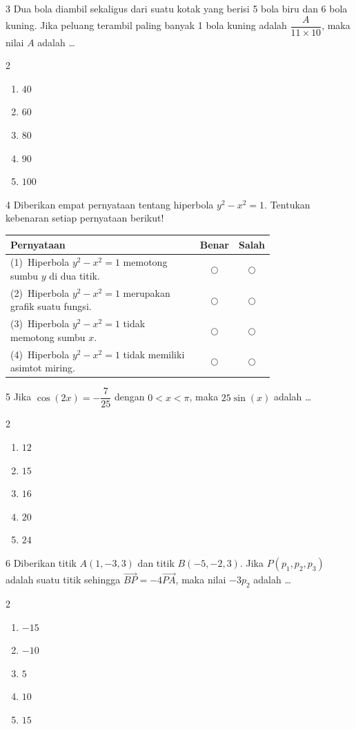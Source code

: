\documentclass[11pt]{article}
\newenvironment{pilB}{%
  \par\smallskip\begin{multicols}{2}
  \begin{enumerate}[label=(\Alph*),leftmargin=*,itemsep=1pt,topsep=3pt]}%
  {\end{enumerate}\end{multicols}}
\begin{document}
\begin{soal}{3}
Dua bola diambil sekaligus dari suatu kotak yang berisi 5 bola biru
dan 6 bola kuning. Jika peluang terambil paling banyak 1 bola kuning
adalah $\dfrac{A}{11\times10}$, maka nilai $A$ adalah \ldots
\begin{pilB}
  \item $40$ \item $60$ \item $80$ \item $90$ \item $100$
\end{pilB}
\end{soal}

\begin{soal}{4}
Diberikan empat pernyataan tentang hiperbola $y^2-x^2=1$.
Tentukan kebenaran setiap pernyataan berikut!

\par\smallskip
{\renewcommand{\arraystretch}{1.4}%
\begin{tabular}{@{}p{0.76\linewidth}cc@{}}
\hline
\textbf{Pernyataan} & \textbf{Benar} & \textbf{Salah}\\
\hline
(1)~Hiperbola $y^2-x^2=1$ memotong sumbu $y$ di dua titik.
  & $\bigcirc$ & $\bigcirc$\\
(2)~Hiperbola $y^2-x^2=1$ merupakan grafik suatu fungsi.
  & $\bigcirc$ & $\bigcirc$\\
(3)~Hiperbola $y^2-x^2=1$ tidak memotong sumbu $x$.
  & $\bigcirc$ & $\bigcirc$\\
(4)~Hiperbola $y^2-x^2=1$ tidak memiliki asimtot miring.
  & $\bigcirc$ & $\bigcirc$\\
\hline
\end{tabular}}
\end{soal}

\begin{soal}{5}
Jika $\cos(2x)=-\dfrac{7}{25}$ dengan $0<x<\pi$,
maka $25\sin(x)$ adalah \ldots
\begin{pilB}
  \item $12$ \item $15$ \item $16$ \item $20$ \item $24$
\end{pilB}
\end{soal}

\begin{soal}{6}
Diberikan titik $A(1,-3,3)$ dan titik $B(-5,-2,3)$. Jika
$P(p_1,p_2,p_3)$ adalah suatu titik sehingga
$\overrightarrow{BP}=-4\overrightarrow{PA}$,
maka nilai $-3p_2$ adalah \ldots
\begin{pilB}
  \item $-15$ \item $-10$ \item $5$ \item $10$ \item $15$
\end{pilB}
\end{soal}
\end{document}
